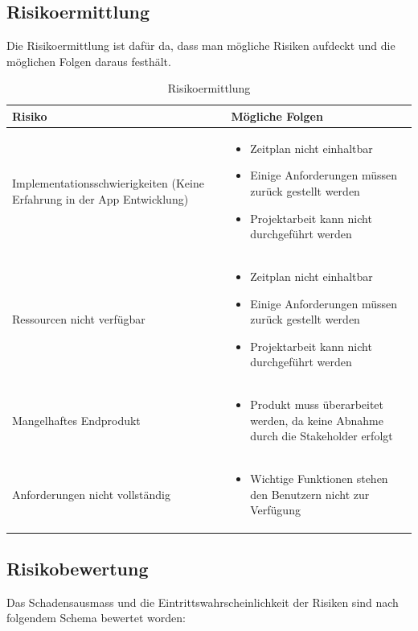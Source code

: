 \subsection{Risikoermittlung}\label{risikoermittlung}
Die Risikoermittlung ist dafür da, dass man mögliche Risiken aufdeckt und die möglichen Folgen daraus festhält.

\begin{table}[ht]
\centering
  \begin{tabular}{  p{5cm} | p{9cm} }
	\hline
	\rowcolor{gray}
	Risiko							&	Mögliche Folgen	\\ \hline
	Implementationsschwierigkeiten (Keine Erfahrung in der App Entwicklung)
								&	\begin{itemize}
										\item Zeitplan nicht einhaltbar
										\item Einige Anforderungen müssen zurück gestellt werden
										\item Projektarbeit kann nicht durchgeführt werden
									\end{itemize}	\\ \hline
	Ressourcen nicht verfügbar
								&	\begin{itemize}
										\item Zeitplan nicht einhaltbar
										\item Einige Anforderungen müssen zurück gestellt werden
										\item Projektarbeit kann nicht durchgeführt werden
									\end{itemize}	\\ \hline
	Mangelhaftes Endprodukt		
								&	\begin{itemize}
										\item Produkt muss überarbeitet werden, da keine Abnahme durch die Stakeholder erfolgt
									\end{itemize}	\\ \hline	
	Anforderungen nicht vollständig	
								&	\begin{itemize}
										\item Wichtige Funktionen stehen den Benutzern nicht zur Verfügung
									\end{itemize}	\\ \hline			
  \end{tabular}
   \caption{Risikoermittlung}
\end{table}

\subsection{Risikobewertung}
Das Schadensausmass und die Eintrittswahrscheinlichkeit der Risiken sind nach folgendem Schema bewertet worden:

